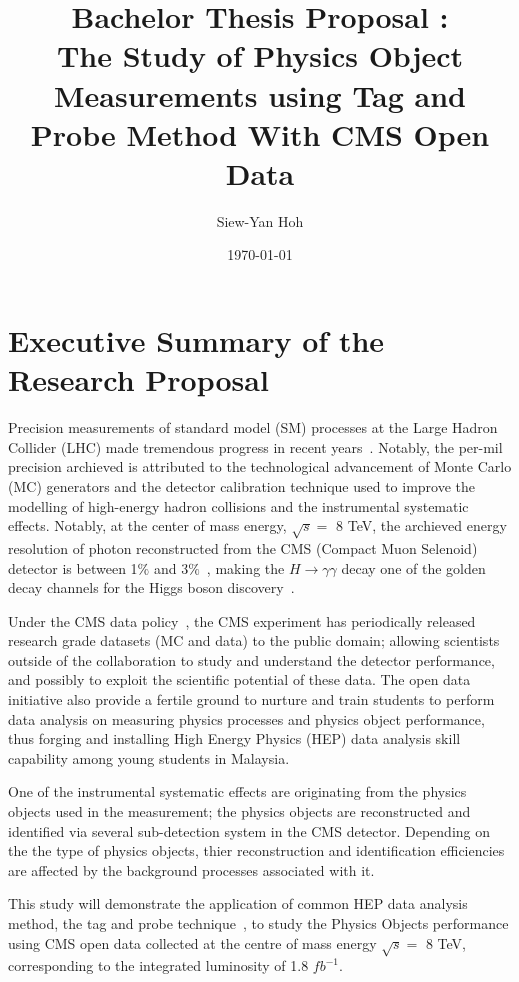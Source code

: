 \documentclass[bibliography=totoc]{article}
\title{Bachelor Thesis Proposal : \\ The Study of Physics Object Measurements using Tag and Probe Method With CMS Open Data}
\author{Siew-Yan Hoh}
\date{\today}
\begin{document}
\maketitle

\section{Executive Summary of the Research Proposal}

Precision measurements of standard model (SM) processes at the Large Hadron Collider (LHC) made tremendous progress in recent years~\cite{ATLAS:2016nqi,CMS:2014pkt,CMS:2013hon,ATLAS:2016rnf,ATLAS:2015iiu}. Notably, the per-mil precision archieved is attributed to the technological advancement of Monte Carlo (MC) generators and the detector calibration technique used to improve the modelling of high-energy hadron collisions and the instrumental systematic effects. Notably, at the center of mass energy, $\sqrt{s} = $ 8 TeV, the archieved energy resolution of photon reconstructed from the CMS (Compact Muon Selenoid) detector is between 1$\%$ and 3$\%$~\cite{2015pho}, making the $H \rightarrow \gamma \gamma$ decay one of the golden decay channels for the Higgs boson discovery~\cite{CMS:2012qbp}.

Under the CMS data policy~\cite{cmsopendata}, the CMS experiment has periodically released research grade datasets (MC and data) to the public domain; allowing scientists outside of the collaboration to study and understand the detector performance, and possibly to exploit the scientific potential of these data. The open data initiative also provide a fertile ground to nurture and train students to perform data analysis on measuring physics processes and physics object performance, thus forging and installing High Energy Physics (HEP) data analysis skill capability among young students in Malaysia.

One of the instrumental systematic effects are originating from the physics objects used in the measurement; the physics objects are reconstructed and identified via several sub-detection system in the CMS detector. Depending on the the type of physics objects, thier reconstruction and identification efficiencies are affected by the background processes associated with it.

This study will demonstrate the application of common HEP data analysis method, the tag and probe technique~\cite{Behnke:1517556}, to study the Physics Objects performance using CMS open data collected at the centre of mass energy $\sqrt{s} =$ 8 TeV, corresponding to the integrated luminosity of 1.8 $fb^{-1}$.
\end{document}
